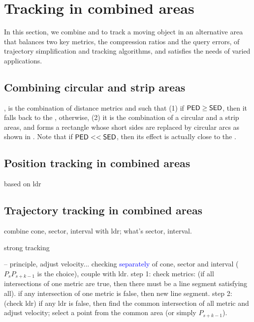 

\section{Tracking in combined areas}
\label{sec:combine}

In this section, we combine \sed and \ped to track a moving object in an alternative area that balances two key metrics, \ie the compression ratios and the query errors, of trajectory simplification and tracking algorithms, and satisfies the needs of varied applications.

\subsection{Combining circular and strip areas}

, is the combination of distance metrics \sed and \ped such that (1) if ${\mathsf{PED}} \ge {\ensuremath {\mathsf{SED}}}$, then it falls back to the \sed, otherwise, (2) it is the combination of a circular and a strip areas, and forms a rectangle whose short sides are replaced by circular arcs as shown in . Note that if ${\mathsf{PED}} << {\mathsf{SED}}$, then its effect is actually close to the \ped.



\subsection{Position tracking in combined areas}
based on ldr


\subsection{Trajectory tracking in combined areas}

combine cone, sector, interval with ldr; what's sector, interval.


strong tracking

-- principle, adjust velocity...
	checking \textcolor{blue}{separately} of cone, sector and interval ($P_sP_{s+k-1}$ is the choice), couple with ldr.
	step 1: check metrics: (if all intersections of one metric are true, then there must be a line segment satisfying all).
	if any intersection of one metric is false, then new line segment.
	step 2:	(check ldr) if any ldr is false, then find the common intersection of all metric and adjust velocity; select a point from the common area (or simply $P_{s+k-1}$).


